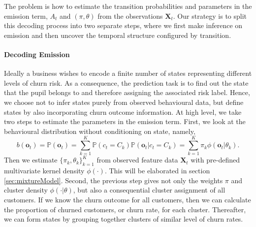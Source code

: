 The problem is how to estimate the transition probabilities and parameters in the emission term, $A_t$ and $(\pi, \theta)$ from the observations $\mathbf{X}_t$. Our strategy is to split this decoding process into two separate steps, where we first make inference on emission and then uncover the temporal structure configured by transition.

\paragraph*{Decoding Emission}

Ideally a business wishes to encode a finite number of states representing different levels of churn risk. As a consequence, the prediction task is to find out the state that the pupil belongs to and therefore assigning the associated risk label. Hence, we choose not to infer states purely from observed behavioural data, but define states by also incorporating churn outcome information. At high level, we take two steps to estimate the parameters in the emission term. First, we look at the behavioural distribution without conditioning on state, namely,
\begin{equation}
b(\mathbf{o}_t) = \mathbb{P} (\mathbf{o}_t) = \sum_{k=1}^K \mathbb{P} (c_t = C_k) \mathbb{P} (\mathbf{o}_t | c_t = C_k) = \sum_{k=1}^K \pi_k \phi(\mathbf{o}_t | \theta_k).
\label{eq:bo}
\end{equation}
Then we estimate $\{ \pi_k, \theta_k \}_{k=1}^K$ from observed feature data $\mathbf{X}_t$ with pre-defined multivariate kernel density $\phi(\cdot)$. This will be elaborated in section \ref{sec:mixtureModel}. Second, the previous step gives not only the weights $\pi$ and cluster density $\phi(\cdot | \theta)$, but also a consequential cluster assignment of all customers. If we know the churn outcome for all customers, then we can calculate the proportion of churned customers, or churn rate, for each cluster. Thereafter, we can form states by grouping together clusters of similar level of churn rates.

